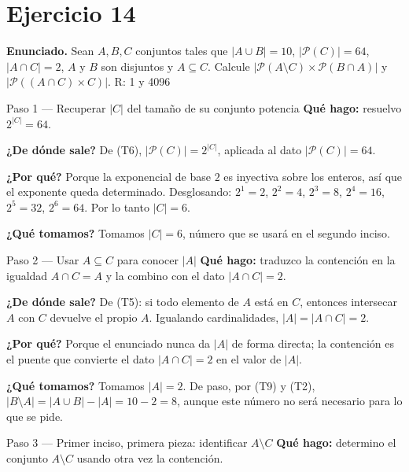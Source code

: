 \documentclass[11pt]{article}
\begin{document}
\section*{Ejercicio 14}

\textbf{Enunciado.} Sean $A, B, C$ conjuntos tales que $|A\cup B| = 10$, $|\mathcal{P}(C)| = 64$, $|A\cap C| = 2$, $A$ y $B$ son disjuntos y $A\subseteq C$. Calcule $|\mathcal{P}(A\setminus C)\times \mathcal{P}(B\cap A)|$ y $|\mathcal{P}((A\cap C)\times C)|$. R: 1 y 4096

\begin{sol}

\begin{paso}{Paso 1 --- Recuperar $|C|$ del tamaño de su conjunto potencia}
\textbf{Qué hago:} resuelvo $2^{|C|} = 64$.

\textbf{¿De dónde sale?} De (T6), $|\mathcal{P}(C)| = 2^{|C|}$, aplicada al dato $|\mathcal{P}(C)| = 64$.

\textbf{¿Por qué?} Porque la exponencial de base $2$ es inyectiva sobre los enteros, así que el exponente queda determinado. Desglosando: $2^{1}=2$, $2^{2}=4$, $2^{3}=8$, $2^{4}=16$, $2^{5}=32$, $2^{6}=64$. Por lo tanto $|C| = 6$.

\textbf{¿Qué tomamos?} Tomamos $|C| = 6$, número que se usará en el segundo inciso.
\end{paso}

\begin{paso}{Paso 2 --- Usar $A\subseteq C$ para conocer $|A|$}
\textbf{Qué hago:} traduzco la contención en la igualdad $A\cap C = A$ y la combino con el dato $|A\cap C| = 2$.

\textbf{¿De dónde sale?} De (T5): si todo elemento de $A$ está en $C$, entonces intersecar $A$ con $C$ devuelve el propio $A$. Igualando cardinalidades, $|A| = |A\cap C| = 2$.

\textbf{¿Por qué?} Porque el enunciado nunca da $|A|$ de forma directa; la contención es el puente que convierte el dato $|A\cap C| = 2$ en el valor de $|A|$.

\textbf{¿Qué tomamos?} Tomamos $|A| = 2$. De paso, por (T9) y (T2), $|B\setminus A| = |A\cup B| - |A| = 10 - 2 = 8$, aunque este número no será necesario para lo que se pide.
\end{paso}

\begin{paso}{Paso 3 --- Primer inciso, primera pieza: identificar $A\setminus C$}
\textbf{Qué hago:} determino el conjunto $A\setminus C$ usando otra vez la contención.


\end{paso}
\end{sol}
\end{document}
